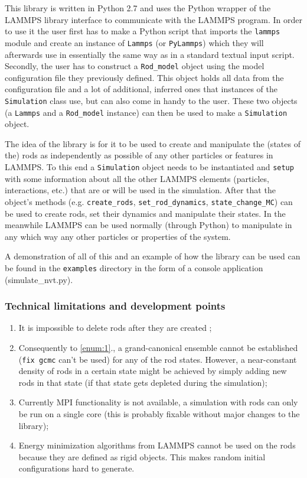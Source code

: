 \documentclass[a4paper]{article}
\begin{document}
This library is written in Python 2.7 and uses the Python wrapper of the LAMMPS library interface to
communicate with the LAMMPS program. In order to use it the user first has to make a Python script that
imports the \texttt{lammps} module and create an instance of \texttt{Lammps} (or \texttt{PyLammps})
which they will afterwards use in essentially the same way as in a standard textual input script.
Secondly, the user has to construct a \texttt{Rod\_model} object using the model configuration file they
previously defined. This object holds all data from the configuration file and a lot of additional,
inferred ones that instances of the \texttt{Simulation} class use, but can also come in handy to the
user. These two objects (a \texttt{Lammps} and a \texttt{Rod\_model} instance) can then be used to make
a \texttt{Simulation} object.

\vspace{1em}

The idea of the library is for it to be used to create and manipulate the (states of the) rods as
independently as possible of any other particles or features in LAMMPS. To this end a
\texttt{Simulation} object needs to be instantiated and \texttt{setup} with some information about all
the other LAMMPS elements (particles, interactions, etc.) that are or will be used in the simulation.
After that the object's methods (e.g. \texttt{create\_rods}, \texttt{set\_rod\_dynamics},
\texttt{state\_change\_MC}) can be used to create rods, set their dynamics and manipulate their states.
In the meanwhile LAMMPS can be used normally (through Python) to manipulate in any which way any other
particles or properties of the system.

\vspace{1em}

A demonstration of all of this and an example of how the library can be used can be found in the
\texttt{examples} directory in the form of a console application (simulate\_nvt.py).

\subsubsection*{Technical limitations and development points}

\begin{enumerate}
	\item It is impossible to delete rods after they are created \label{enum:1};
	\item Consequently to \ref{enum:1}., a grand-canonical ensemble cannot be established (\texttt{fix
	gcmc} can't be used) for any of the rod states. However, a near-constant density of rods in a certain
	state might be achieved by simply adding new rods in that state (if that state gets depleted during the
	simulation);
	\item Currently MPI functionality is not available, a simulation with rods can only be run on a single
	core (this is probably fixable without major changes to the library);
	\item Energy minimization algorithms from LAMMPS cannot be used on the rods because they are defined as
	rigid objects. This makes random initial configurations hard to generate.
\end{enumerate}
\end{document}
